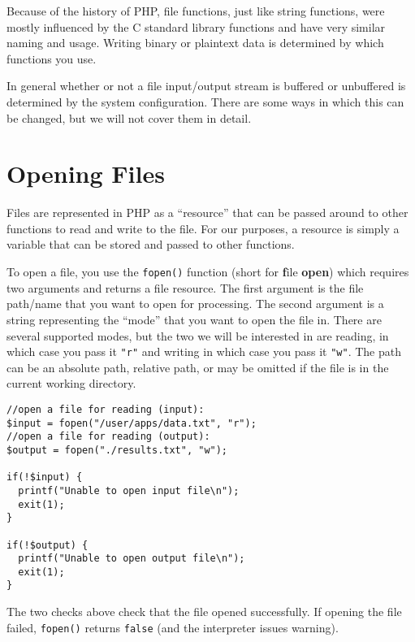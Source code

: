 

Because of the history of PHP, file functions, 
just like string functions, were mostly influenced
by the C standard library functions and have
very similar naming and usage.  Writing
binary or plaintext data is determined by which
functions you use.

In general whether or not a file input/output
stream is buffered or unbuffered is determined by
the system configuration.  There are some ways
in which this can be changed, but we will not 
cover them in detail.

\section{Opening Files}

Files are represented in PHP as a ``resource'' that
can be passed around to other functions to read and
write to the file.  For our purposes, a resource is
simply a variable that can be stored and passed
to other functions.  

To open a file, you use the \texttt{fopen()} 
function (short for \textbf{f}ile \textbf{open}) which
requires two arguments and returns a file resource.
The first argument is the file path/name that you want
to open for processing.  The second argument is a
string representing the ``mode'' that you want to open the
file in.  There are several supported modes, but the two 
we will be interested in are reading, in which case you
pass it \texttt{"r"} and writing in which case you
pass it \texttt{"w"}.  The path can be an absolute 
path, relative path, or may be omitted if the file is in the
current working directory.

\begin{verbatim}
//open a file for reading (input):
$input = fopen("/user/apps/data.txt", "r");
//open a file for reading (output):
$output = fopen("./results.txt", "w");

if(!$input) {
  printf("Unable to open input file\n");
  exit(1);
}

if(!$output) {
  printf("Unable to open output file\n");
  exit(1);
}
\end{verbatim}

The two checks above check that the file opened successfully.
If opening the file failed, \texttt{fopen()} returns
\texttt{false} (and the interpreter issues  warning).  

